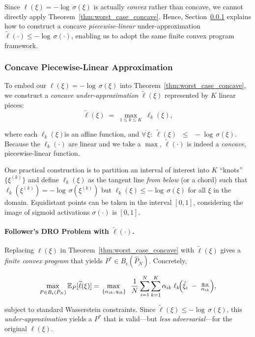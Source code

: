 Since $\ell(\xi)=-\!\log\,\sigma(\xi)$ is actually \emph{convex} rather than concave, 
we cannot directly apply Theorem~\ref{thm:worst_case_concave}. 
Hence, Section~\ref{subsec:concave_approx} explains how to construct 
a concave \emph{piecewise-linear} under-approximation 
$\widetilde{\ell}(\cdot)\le -\!\log\,\sigma(\cdot)$, 
enabling us to adopt the same finite convex program framework.

\subsubsection{Concave Piecewise-Linear Approximation}
\label{subsec:concave_approx}

To embed our $\ell(\xi)=-\!\log\,\sigma(\xi)$ into 
Theorem~\ref{thm:worst_case_concave}, we construct a \emph{concave under-approximation} 
$\widetilde{\ell}(\xi)$ represented by $K$ linear pieces:
\begin{equation}
\label{eq:piecewise_concave_ell}
\widetilde{\ell}(\xi)
\;=\;
\max_{1\le k\le K}\;\ell_k(\xi),
\end{equation}

where each $\ell_k(\xi)$is an affine function, and
$\forall\,\xi:\;
\widetilde{\ell}(\xi)
\;\;\le\;\;
-\!\log\,\sigma(\xi)$.
Because the $\ell_k(\cdot)$ are linear and we take a $\max$, 
$\widetilde{\ell}(\cdot)$ is indeed a \emph{concave}, piecewise-linear function.  

One practical construction is to partition an interval of interest into $K$ “knots” 
$\{\xi^{(k)}\}$ and define $\ell_k(\xi)$ as the tangent line \emph{from below} 
(or a chord) such that $\ell_k(\xi^{(k)}) = -\!\log\,\sigma(\xi^{(k)})$ 
but $\ell_k(\xi)\le -\!\log\,\sigma(\xi)$ for all $\xi$ in the domain.  
Equidistant points can be taken in the interval $[0,1]$, considering the image of sigmoid activations $\sigma(\cdot)$ is $[0,1]$.

\paragraph{Follower’s DRO Problem with $\widetilde{\ell}(\cdot)$.}
Replacing $\ell(\xi)$ in Theorem~\ref{thm:worst_case_concave} with 
$\widetilde{\ell}(\xi)$ gives a \emph{finite convex program} that yields 
$P^*\in B_\epsilon(\hat{P}_N)$.  Concretely, 
\begin{small}
  \begin{equation}
\label{eq:widetilde_dro}
\max_{P \in B_\epsilon(\hat{P}_N)}
\mathbb{E}_P[\widetilde{\ell}(\xi)]
=
\max_{\,\{\alpha_{ik},\,q_{ik}\}}
\;\;
\frac{1}{N}
\sum_{i=1}^N
\sum_{k=1}^K
\alpha_{ik}
\;\ell_k\!\Bigl(\hat{\xi}_i \;-\; \tfrac{q_{ik}}{\alpha_{ik}}\Bigr),
\end{equation}  
\end{small}
subject to standard Wasserstein constraints.  
Since $\widetilde{\ell}(\xi)\le -\!\log\,\sigma(\xi)$, 
this \emph{under-approximation} yields a $P^*$ that is valid---but 
\emph{less adversarial}---for the original $\ell(\xi)$.

